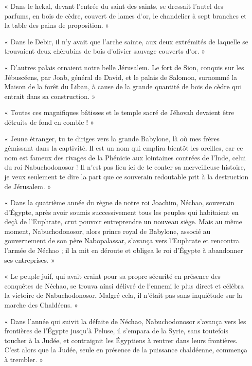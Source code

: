 \documentclass[a4paper, 11pt, oneside, polutonikogreek, french]{article}
\begin{document}
« Dans le hekal, devant l'entrée du saint des saints, se dressait l'autel des parfums, en bois de cèdre, couvert de lames d'or, le chandelier à sept branches et la table des pains de proposition. »

« Dans le Debir, il n'y avait que l'arche sainte, aux deux extrémités de laquelle se trouvaient deux chérubins de bois d'olivier sauvage couverts d'or. »

« D'autres palais ornaient notre belle Jérusalem. Le fort de Sion, conquis sur les Jébuscéens, par Joab, général de David, et le palais de Salomon, surnommé la Maison de la forêt du Liban, à cause de la grande quantité de bois de cèdre qui entrait dans sa construction. »

« Toutes ces magnifiques bâtisses et le temple sacré de Jéhovah devaient être détruits de fond en comble ! »

\bigskip
\centerline{\EightStarTaper}
\centerline{\EightStarTaper\EightStarTaper}
\bigskip

« Jeune étranger, tu te diriges vers la grande Babylone, là où mes frères gémissant dans la captivité. Il est un nom qui emplira bientôt les oreilles, car ce nom est fameux des rivages de la Phénicie aux lointaines contrées de l'Inde, celui du roi Nabuchodonosor ! Il n'est pas lieu ici de te conter sa merveilleuse histoire, je veux seulement te dire la part que ce souverain redoutable prit à la destruction de Jérusalem. »

\bigskip
\centerline{\EightStarTaper}
\centerline{\EightStarTaper\EightStarTaper}
\bigskip

« Dans la quatrième année du règne de notre roi Joachim, Néchao, souverain d'Égypte, après avoir soumis successivement tous les peuples qui habitaient en deçà de l'Euphrate, crut pouvoir entreprendre un nouveau siège. Mais au même moment, Nabuchodonosor, alors prince royal de Babylone, associé au gouvernement de son père Nabopalassar, s'avança vers l'Euphrate et rencontra l'armée de Néchao ; il la mit en déroute et obligea le roi d'Égypte à abandonner ses entreprises. »

« Le peuple juif, qui avait craint pour sa propre sécurité en présence des conquêtes de Néchao, se trouva ainsi délivré de l'ennemi le plus direct et célébra la victoire de Nabuchodonosor. Malgré cela, il n'était pas sans inquiétude sur la marche des Chaldéens. »

« Dans l'année qui suivit la défaite de Néchao, Nabuchodonosor s'avança vers les frontières de l'Égypte jusqu'à Peluse, il s'empara de la Syrie, sans toutefois toucher à la Judée, et contraignit les Égyptiens à rentrer dans leurs frontières. C'est alors que la Judée, seule en présence de la puissance chaldéenne, commença à trembler. »
\end{document}
